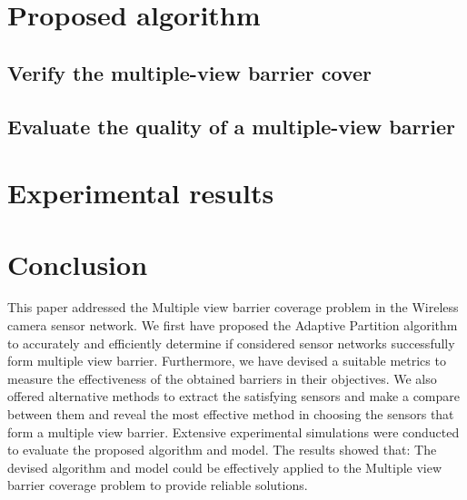 \documentclass[3p]{elsarticle}
\begin{document}
\section{Proposed algorithm}
\subsection{Verify the multiple-view barrier cover}


\subsection{Evaluate the quality of a multiple-view barrier}
\label{baCal}


\section{Experimental results}
\label{sec:exp}


\section{Conclusion}
%
This paper addressed the Multiple view barrier coverage problem in the Wireless camera sensor network. We first have proposed the Adaptive Partition algorithm to accurately and efficiently determine if considered sensor networks successfully form multiple view barrier. Furthermore, we have devised a suitable metrics to measure the effectiveness of the obtained barriers in their objectives. We also offered alternative methods to extract the satisfying sensors and make a compare between them and reveal the most effective method in choosing the sensors that form a multiple view barrier. Extensive experimental simulations were conducted to evaluate the proposed algorithm and model. The results showed that: The devised algorithm and model could be effectively applied to the Multiple view barrier coverage problem to provide reliable solutions.

%

%
\end{document}
